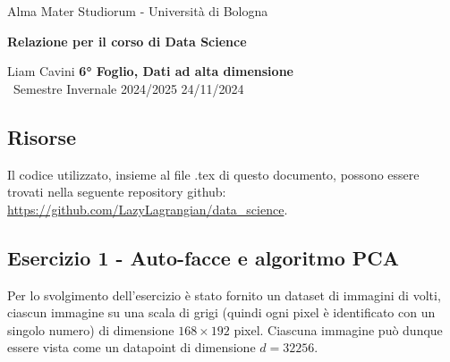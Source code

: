 \documentclass{article}
\begin{document}
\begin{center}
    {\Large Alma Mater Studiorum - Università di Bologna}
    
    \vspace{0.5cm}
    {\bf \large Relazione per il corso di Data Science}
\end{center} 

\noindent
{Liam Cavini} \hfill {\bf 6° Foglio, Dati ad alta dimensione}\\
{\ Semestre Invernale 2024/2025} \hfill 24/11/2024

\subsection*{Risorse}
Il codice utilizzato, insieme al file .tex di questo documento, possono essere trovati nella seguente repository github: \url{https://github.com/LazyLagrangian/data_science}.

\subsection*{Esercizio 1 - Auto-facce e algoritmo PCA }
Per lo svolgimento dell'esercizio è stato fornito un dataset di immagini di volti, ciascun immagine su una scala di grigi (quindi ogni pixel è identificato con un singolo numero) di dimensione $168 \times 192$ pixel.
Ciascuna immagine può dunque essere vista come un datapoint di dimensione $d = 32256$.
\end{document}
